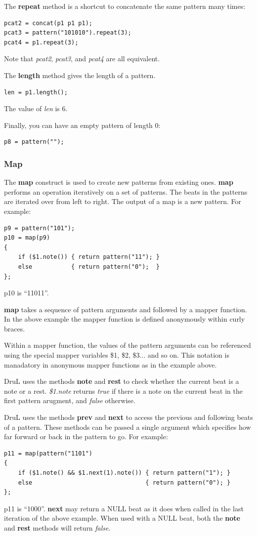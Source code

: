 \documentclass[11pt,twoside]{article}
\begin{document}
The \textbf{repeat} method is a shortcut to concatenate the same pattern many times:
\begin{verbatim}
pcat2 = concat(p1 p1 p1);
pcat3 = pattern("101010").repeat(3);
pcat4 = p1.repeat(3);
\end{verbatim}
Note that \textit{pcat2}, \textit{pcat3}, and \textit{pcat4} are all equivalent.

The \textbf{length} method gives the length of a pattern.
\begin{verbatim}
len = p1.length();
\end{verbatim}
The value of \textit{len} is $6$.

Finally, you can have an empty pattern of length $0$:
\begin{verbatim}
p8 = pattern("");
\end{verbatim}



\subsubsection{Map}

The \textbf{map} construct is used to create new patterns from existing ones.
\textbf{map} performs an operation iteratively on a set of patterns.
The beats in the patterns are iterated over from left to right.
The output of a map is a new pattern.  For example:
\begin{verbatim}
p9 = pattern("101");
p10 = map(p9)
{
    if ($1.note()) { return pattern("11"); }
    else           { return pattern("0");  }
};
\end{verbatim}
p10 is ``11011''.

\textbf{map} takes a sequence of pattern arguments and followed by a mapper function.  In the above example the mapper function is defined anonymously within curly braces.

Within a mapper function, the values of the pattern arguments can be referenced using the special mapper variables \$1, \$2, \$3... and so on.  This notation is manadatory in anonymous mapper functions as in the example above.

DruL uses the methods \textbf{note} and \textbf{rest} to check whether
the current beat is a note or a rest.  
\textit{\$1.note} returns \textit{true} if there is a note on the current beat in the first pattern arugment, and \textit{false} otherwise.

DruL uses the methods \textbf{prev} and \textbf{next} to access the previous and following beats of a pattern. These methods can be passed a single argument which specifies how far forward or back in the pattern to go.  For example:
\begin{verbatim}
p11 = map(pattern("1101")
{
    if ($1.note() && $1.next(1).note()) { return pattern("1"); }
    else                                { return pattern("0"); }
};
\end{verbatim}
p11 is ``1000''.  \textbf{next} may return a NULL beat as it does when called in the last iteration of the above example.  When used with a NULL beat, both the \textbf{note} and \textbf{rest} methods will return \textit{false}.
\end{document}
